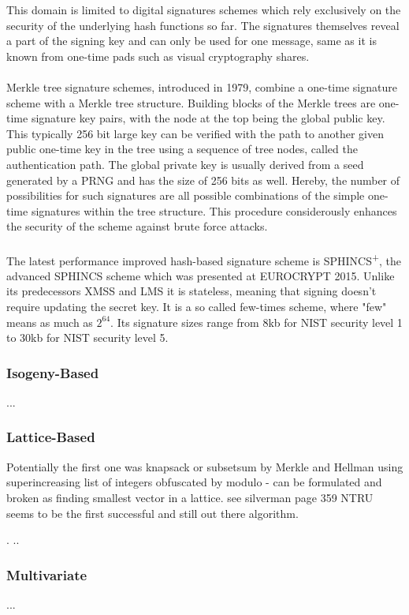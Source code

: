 \documentclass[a4paper,11pt]{article}
\begin{document}
\begin{multicols}{2}
This domain is limited to digital signatures schemes which rely exclusively on the security of the underlying hash functions so far. The signatures themselves reveal a part of the signing key and can only be used for one message, same as it is known from one-time pads such as visual cryptography shares. \\
\\
Merkle tree signature schemes, introduced in 1979, combine a one-time signature scheme with a Merkle tree structure. Building blocks of the Merkle trees are one-time signature key pairs, with the node at the top being the global public key. This typically 256 bit large key can be verified with the path to another given public one-time key in the tree using a sequence of tree nodes, called the authentication path. The global private key is usually derived from a seed generated by a PRNG and has the size of 256 bits as well.
Hereby, the number of possibilities for such signatures are all possible combinations of the simple one-time signatures within the tree structure. This procedure considerously enhances the security of the scheme against brute force attacks. \\
\\
The latest performance improved hash-based signature scheme is SPHINCS\textsuperscript{+}, the advanced SPHINCS scheme which was presented at EUROCRYPT 2015. Unlike its predecessors XMSS and LMS it is stateless, meaning that signing doesn't require updating the secret key. It is a so called few-times scheme, where "few" means as much as $2^{64}$. Its signature sizes range from 8kb for NIST security level 1 to 30kb for NIST security level 5.\\


\subsubsection{Isogeny-Based}
...

\subsubsection{Lattice-Based}
Potentially the first one was knapsack or subsetsum by Merkle and Hellman using superincreasing list of integers obfuscated by modulo  - can be formulated and broken as finding smallest vector in a lattice. see silverman page 359
NTRU seems to be the first successful and still out there algorithm.
  
.
..

\subsubsection{Multivariate}
...



\end{multicols}

 
\end{document}
